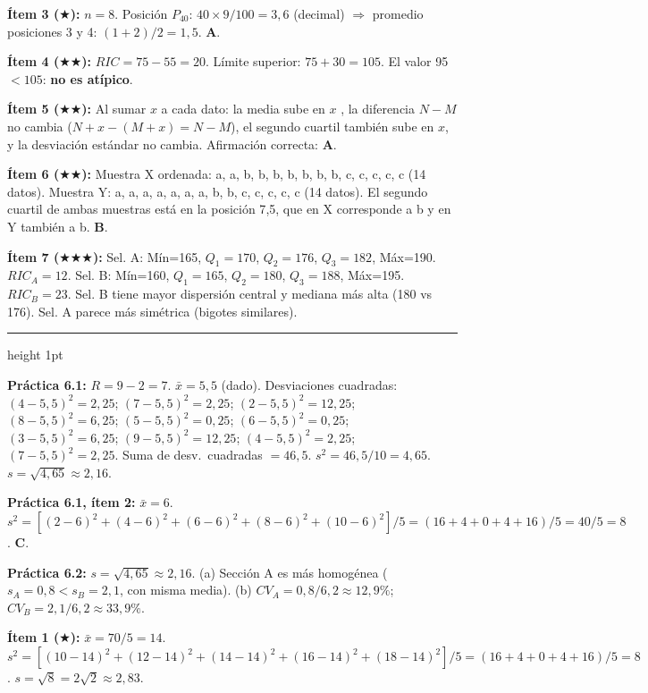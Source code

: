 \documentclass[11pt, letterpaper]{article}
\newcommand{\subbloque}[1]{%
  \vspace{14pt}
  \noindent{\large\bfseries\color{zenitnavy} #1}\par
  \vspace{4pt}\hrule height 1pt\vspace{8pt}}
\begin{document}
\textbf{Ítem 3 ($\bigstar$):}
$n=8$. Posición $P_{40}$: $40\times9/100=3{,}6$ (decimal) $\Rightarrow$ promedio posiciones 3 y 4: $(1+2)/2=1{,}5$. \textbf{A}.

\textbf{Ítem 4 ($\bigstar\bigstar$):}
$RIC=75-55=20$. Límite superior: $75+30=105$. El valor 95 $< 105$: \textbf{no es atípico}.

\textbf{Ítem 5 ($\bigstar\bigstar$):}
Al sumar $x$ a cada dato: la media sube en $x$ \checkmark, la diferencia $N-M$ no cambia ($N+x-(M+x)=N-M$), el segundo cuartil también sube en $x$, y la desviación estándar no cambia. Afirmación correcta: \textbf{A}.

\textbf{Ítem 6 ($\bigstar\bigstar$):}
Muestra X ordenada: a, a, b, b, b, b, b, b, b, c, c, c, c, c (14 datos). Muestra Y: a, a, a, a, a, a, a, b, b, c, c, c, c, c (14 datos). El segundo cuartil de ambas muestras está en la posición 7{,}5, que en X corresponde a b y en Y también a b. \textbf{B}.

\textbf{Ítem 7 ($\bigstar\bigstar\bigstar$):}
Sel. A: Mín=165, $Q_1=170$, $Q_2=176$, $Q_3=182$, Máx=190. $RIC_A=12$.
Sel. B: Mín=160, $Q_1=165$, $Q_2=180$, $Q_3=188$, Máx=195. $RIC_B=23$.
Sel. B tiene mayor dispersión central y mediana más alta (180 vs 176). Sel. A parece más simétrica (bigotes similares).

\subbloque{Sección 6 --- Medidas de dispersión}

\textbf{Práctica 6.1:}
$R=9-2=7$. $\bar{x}=5{,}5$ (dado). Desviaciones cuadradas:
$(4{-}5{,}5)^2=2{,}25$; $(7{-}5{,}5)^2=2{,}25$; $(2{-}5{,}5)^2=12{,}25$; $(8{-}5{,}5)^2=6{,}25$;
$(5{-}5{,}5)^2=0{,}25$; $(6{-}5{,}5)^2=0{,}25$; $(3{-}5{,}5)^2=6{,}25$; $(9{-}5{,}5)^2=12{,}25$;
$(4{-}5{,}5)^2=2{,}25$; $(7{-}5{,}5)^2=2{,}25$.
Suma de desv.\ cuadradas $= 46{,}5$. $s^2=46{,}5/10=4{,}65$. $s=\sqrt{4{,}65}\approx2{,}16$.

\textbf{Práctica 6.1, ítem 2:}
$\bar{x}=6$. $s^2=[(2{-}6)^2+(4{-}6)^2+(6{-}6)^2+(8{-}6)^2+(10{-}6)^2]/5=(16+4+0+4+16)/5=40/5=8$. \textbf{C}.

\textbf{Práctica 6.2:}
$s=\sqrt{4{,}65}\approx2{,}16$.
(a) Sección A es más homogénea ($s_A=0{,}8<s_B=2{,}1$, con misma media).
(b) $CV_A=0{,}8/6{,}2\approx12{,}9\%$; $CV_B=2{,}1/6{,}2\approx33{,}9\%$.

\textbf{Ítem 1 ($\bigstar$):}
$\bar{x}=70/5=14$. $s^2=[(10{-}14)^2+(12{-}14)^2+(14{-}14)^2+(16{-}14)^2+(18{-}14)^2]/5=(16+4+0+4+16)/5=8$. $s=\sqrt{8}=2\sqrt{2}\approx2{,}83$.
\end{document}
